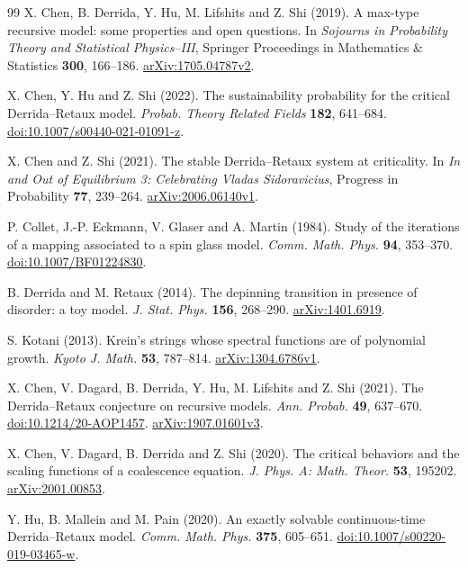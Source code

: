 \documentclass[11pt,letterpaper,reqno]{amsart}
\numberwithin{equation}{section}
\theoremstyle{plain}
\theoremstyle{remark}
\begin{document}
\begin{thebibliography}{99}
 X. Chen, B. Derrida, Y. Hu, M. Lifshits and Z. Shi (2019).
A max-type recursive model: some properties and open questions.
In \emph{Sojourns in Probability Theory and Statistical Physics--III},
Springer Proceedings in Mathematics \& Statistics \textbf{300}, 166--186.
\href{https://arxiv.org/abs/1705.04787v2}{arXiv:1705.04787v2}.

 X. Chen, Y. Hu and Z. Shi (2022).
The sustainability probability for the critical Derrida--Retaux model.
\emph{Probab. Theory Related Fields} \textbf{182}, 641--684.
\href{https://doi.org/10.1007/s00440-021-01091-z}{doi:10.1007/s00440-021-01091-z}.

 X. Chen and Z. Shi (2021).
The stable Derrida--Retaux system at criticality.
In \emph{In and Out of Equilibrium 3: Celebrating Vladas Sidoravicius},
Progress in Probability \textbf{77}, 239--264.
\href{https://arxiv.org/abs/2006.06140v1}{arXiv:2006.06140v1}.

 P. Collet, J.-P. Eckmann, V. Glaser and A. Martin (1984).
Study of the iterations of a mapping associated to a spin glass model.
\emph{Comm. Math. Phys.} \textbf{94}, 353--370.
\href{https://doi.org/10.1007/BF01224830}{doi:10.1007/BF01224830}.

 B. Derrida and M. Retaux (2014).
The depinning transition in presence of disorder: a toy model.
\emph{J. Stat. Phys.} \textbf{156}, 268--290.
\href{https://arxiv.org/abs/1401.6919}{arXiv:1401.6919}.

 S. Kotani (2013).
Krein's strings whose spectral functions are of polynomial growth.
\emph{Kyoto J. Math.} \textbf{53}, 787--814.
\href{https://arxiv.org/abs/1304.6786v1}{arXiv:1304.6786v1}.

 X. Chen, V. Dagard, B. Derrida, Y. Hu, M. Lifshits and Z. Shi (2021).
The Derrida--Retaux conjecture on recursive models.
\emph{Ann. Probab.} \textbf{49}, 637--670.
\href{https://doi.org/10.1214/20-AOP1457}{doi:10.1214/20-AOP1457}.
\href{https://arxiv.org/abs/1907.01601v3}{arXiv:1907.01601v3}.

 X. Chen, V. Dagard, B. Derrida and Z. Shi (2020).
The critical behaviors and the scaling functions of a coalescence equation.
\emph{J. Phys. A: Math. Theor.} \textbf{53}, 195202.
\href{https://arxiv.org/abs/2001.00853}{arXiv:2001.00853}.

 Y. Hu, B. Mallein and M. Pain (2020).
An exactly solvable continuous-time Derrida--Retaux model.
\emph{Comm. Math. Phys.} \textbf{375}, 605--651.
\href{https://doi.org/10.1007/s00220-019-03465-w}{doi:10.1007/s00220-019-03465-w}.


\end{thebibliography}
\end{document}
